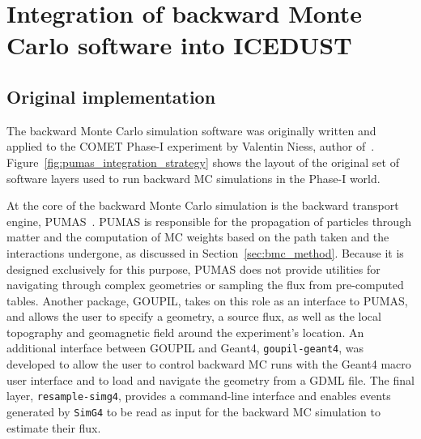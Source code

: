 \chapter{Integration of backward Monte Carlo software into
ICEDUST}
\label{app:bmc_integration}



\section{Original implementation}
The backward Monte Carlo simulation software was originally written and applied
to the COMET Phase-I experiment by Valentin Niess, author
of~\cite{Niess_Barnoud_Carloganu_Menedeu_2018,NIESS2022108438}.
Figure~\ref{fig:pumas_integration_strategy} shows the layout of the original set
of software layers used to run backward MC simulations in the Phase-I world. 

At the core of the backward Monte Carlo simulation is the backward transport
engine, PUMAS~\cite{NIESS2022108438}. PUMAS is responsible for the propagation
of particles through matter and the computation of MC weights based on the path
taken and the interactions undergone, as discussed in
Section~\ref{sec:bmc_method}. Because it is designed exclusively for this
purpose, PUMAS does not provide utilities for navigating through complex
geometries or sampling the flux from pre-computed tables. Another package,
GOUPIL, takes on this role as an interface to PUMAS, and allows the user to
specify a geometry, a source flux, as well as the local topography and
geomagnetic field around the experiment's location. An additional interface
between GOUPIL and {\sc Geant4}, \texttt{goupil-geant4}, was developed to allow
the user to control backward MC runs with the {\sc Geant4} macro user interface
and to load and navigate the geometry from a GDML file. The final layer,
\texttt{resample-simg4}, provides a command-line interface and enables events
generated by \texttt{SimG4} to be read as input for the backward MC simulation
to estimate their flux.


